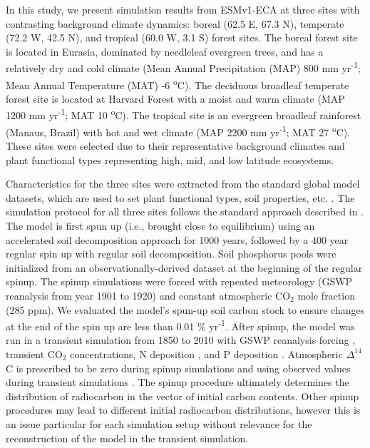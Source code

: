 \documentclass[draft]{agujournal2019}
\begin{document}
  In this study, we present simulation results from ESMv1-ECA at three sites with contrasting background climate dynamics: boreal (62.5 E, 67.3 N), temperate  (72.2 W, 42.5 N), and tropical (60.0 W, 3.1 S) forest sites. The boreal forest site is located in Eurasia, dominated by needleleaf evergreen trees, and has  a relatively dry and cold climate (Mean Annual Precipitation (MAP) 800 mm yr\textsuperscript{-1}; Mean Annual Temperature (MAT) -6 \textsuperscript{o}C). The deciduous broadleaf temperate forest site is located at Harvard Forest with a moist and warm climate (MAP 1200 mm yr\textsuperscript{-1}; MAT 10 \textsuperscript{o}C). The tropical site is an evergreen broadleaf rainforest (Manaus, Brazil) with hot and wet climate (MAP 2200 mm yr\textsuperscript{-1}; MAT 27 \textsuperscript{o}C). These sites were selected due to their representative background climates and plant functional types representing high, mid, and low latitude ecosystems.
    
    Characteristics for the three sites were extracted from the standard global model datasets, which are used to set plant functional types, soil properties, etc. \cite{Zhu2019}. The simulation protocol for all three sites follows the standard approach described in . The model is first spun up (i.e., brought close to equilibrium) using an accelerated soil decomposition approach \cite{Koven2013} for 1000 years, followed by a 400 year regular spin up with regular soil decomposition. Soil phosphorus pools were initialized from an observationally-derived dataset \cite{Yang2013} at the beginning of the regular spinup. The spinup simulations were forced with repeated meteorology (GSWP reanalysis \cite{Dirmeyer2006} from year 1901 to 1920) and constant atmospheric CO$_2$ mole fraction (285 ppm). We evaluated the model's spun-up soil carbon stock to ensure changes at the end of the spin up are less than 0.01 \% yr\textsuperscript{-1}. After spinup, the model was run in a transient simulation from 1850 to 2010 with GSWP reanalysis forcing \cite{Dirmeyer2006}, transient CO$_2$ concentrations, N deposition \cite{Lamarque2005}, and P deposition \cite{Mahowald2008}. Atmospheric   $\Delta^{14}$C  is prescribed to be zero during spinup simulations and using observed values during transient simulations \cite{Levin2010}. The spinup procedure ultimately determines the distribution of radiocarbon in the vector of initial carbon contents. Other spinup procedures may lead to different initial radiocarbon distributions, however this is an issue particular for each simulation setup without relevance for the reconstruction of the model in the transient simulation. 
    
\end{document}
